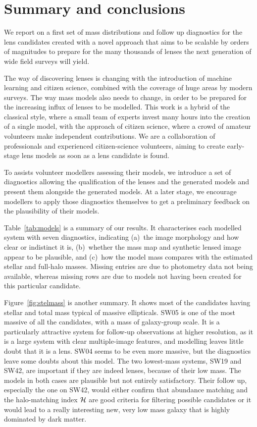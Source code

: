 \section{Summary and conclusions}\label{sec:summary}


We report on a first set of mass distributions and follow up diagnostics for 
the {\SW} lens candidates created with a novel approach that aims to be scalable 
by orders of magnitudes to prepare for the many thousands of lenses the next 
generation of wide field surveys will yield.

The way of discovering lenses is changing with the introduction of
machine learning and citizen science, combined with the coverage of
huge areas by modern surveys.  The way mass models also needs to
change, in order to be prepared for the increasing influx of lenses to
be modelled.  This work is a hybrid of the classical style, where a
small team of experts invest many hours into the creation of a single
model, with the approach of citizen science, where a crowd of amateur
volunteers make independent contributions.  We are a collaboration of
professionals and experienced citizen-science volunteers, aiming to
create early-stage lens models as soon as a lens candidate is found.

To assists volunteer modellers assessing their models, we introduce a
set of diagnostics allowing the qualification of the lenses and the
generated models and present them alongside the generated models. At a
later stage, we encourage modellers to apply those diagnostics
themselves to get a preliminary feedback on the plausibility of their
models.

Table~\ref{tab:models} is a summary of our results.  It characterises
each modelled system with seven diagnostics, indicating (a)~the image
morphology and how clear or indistinct it is, (b)~whether the mass map
and synthetic lensed image appear to be plausible, and (c)~how the
model mass compares with the estimated stellar and full-halo masses.
Missing entries are due to photometry data not being available, whereas
missing rows are due to models not having been created for this particular
candidate.

Figure~\ref{fig:stelmass} is another summary.  It shows most of the
candidates having stellar and total mass typical of massive
ellipticals.  SW05 is one of the most massive of all the candidates, with a
mass of galaxy-group scale.  It is a particularly attractive system
for follow-up observations at higher resolution, as it is a large system
with clear multiple-image features, and modelling leaves little doubt
that it is a lens.
SW04 seems to be even more massive, but the diagnostics leave some doubts
about this model.
The two lowest-mass systems, SW19 and SW42, are
important if they are indeed lenses, because of their low mass.
The models in both cases are plausible but not entirely satisfactory.
Their follow up, especially the one on SW42, would either confirm that
abundance matching and the halo-matching index $\mathcal{H}$ are good
criteria for filtering possible candidates or it would lead to a really
interesting new, very low mass galaxy that is highly dominated by dark matter.

